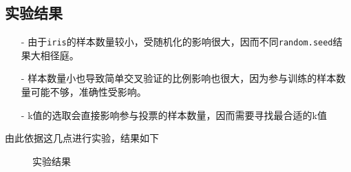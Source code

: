 \documentclass[utf-8]{article}
\begin{document}
\subsection{实验结果}
\begin{itemize}
	\item [-] 由于\verb|iris|的样本数量较小，受随机化的影响很大，因而不同\verb|random.seed|结果大相径庭。
	\item [-] 样本数量小也导致简单交叉验证的比例影响也很大，因为参与训练的样本数量可能不够，准确性受影响。
	\item [-] k值的选取会直接影响参与投票的样本数量，因而需要寻找最合适的k值
\end{itemize}
	由此依据这几点进行实验，结果如下
\begin{figure}[!h]
\caption{实验结果}
\label{fig:2}
\end{figure}
\end{document}
